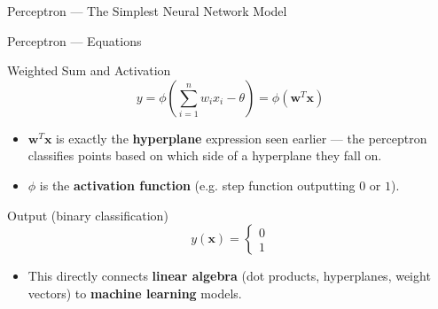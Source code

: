 \documentclass[9pt,aspectratio=169]{beamer}
\newcommand{\vect}[1]{\mathbf{#1}}
\begin{document}
\begin{frame}{Perceptron — The Simplest Neural Network Model}
\centering
{}
\end{frame}

\begin{frame}{Perceptron — Equations}
\begin{block}{Weighted Sum and Activation}
$$y = \phi\left(\sum_{i=1}^n w_ix_i - \theta\right) = \phi(\vect{w}^T\vect{x})$$
\end{block}
\begin{itemize}
\item $\vect{w}^T\vect{x}$ is exactly the \textbf{hyperplane} expression seen earlier — the perceptron classifies points based on which side of a hyperplane they fall on.
\item $\phi$ is the \textbf{activation function} (e.g. step function outputting $0$ or $1$).
\end{itemize}
\begin{block}{Output (binary classification)}
$$y(\vect{x}) = \begin{cases} 0 \\ 1 \end{cases}$$
\end{block}
\begin{itemize}
\item This directly connects \textbf{linear algebra} (dot products, hyperplanes, weight vectors) to \textbf{machine learning} models.
\end{itemize}
\end{frame}

\end{document}
